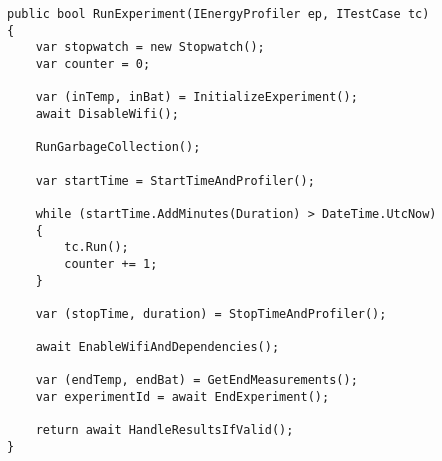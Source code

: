 

\begin{lstlisting}[caption=The method running the test case, label={lst:run_experiments}]
public bool RunExperiment(IEnergyProfiler ep, ITestCase tc)
{
    var stopwatch = new Stopwatch();
    var counter = 0;

    var (inTemp, inBat) = InitializeExperiment();
    await DisableWifi();

    RunGarbageCollection();

    var startTime = StartTimeAndProfiler();

    while (startTime.AddMinutes(Duration) > DateTime.UtcNow)
    {
        tc.Run();
        counter += 1;
    }

    var (stopTime, duration) = StopTimeAndProfiler();

    await EnableWifiAndDependencies();

    var (endTemp, endBat) = GetEndMeasurements();
    var experimentId = await EndExperiment();

    return await HandleResultsIfValid();
}
    \end{lstlisting}